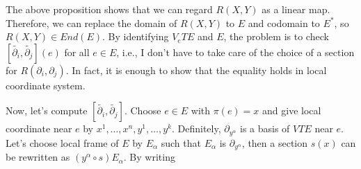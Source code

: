 \documentclass[a4paper, 12pt]{article}
\theoremstyle{Mydefinition}
\theoremstyle{Mytheorem}
\begin{document}
The above proposition shows that we can regard $R(X,Y)$ as a linear map. Therefore, we can replace the domain of $R(X,Y)$ to $E$ and codomain to $E^*$, so $R(X,Y)\in End(E)$. By identifying $V_eTE$ and $E$, the problem is to check $[\tilde{\partial_i}, \tilde{\partial_j}](e)$ for all $e\in E$, i.e., I don't have to take care of the choice of a section for $R(\partial_i,\partial_j)$. In fact, it is enough to show that the equality holds in local coordinate system.

Now, let's compute $[\tilde{\partial_i}, \tilde{\partial_j}]$. Choose $e\in E$ with $\pi(e) = x$ and give local coordinate near $e$ by $x^1, \ldots, x^n, y^1, \ldots, y^k$. Definitely, $\partial_{y^\alpha}$ is a basis of $VTE$ near $e$. Let's choose local frame of $E$ by $E_\alpha$ such that $E_\alpha$ is $\partial_{y^\alpha}$, then a section $s(x)$ can be rewritten as $(y^\alpha \circ s)E_\alpha$. By writing 
\end{document}
